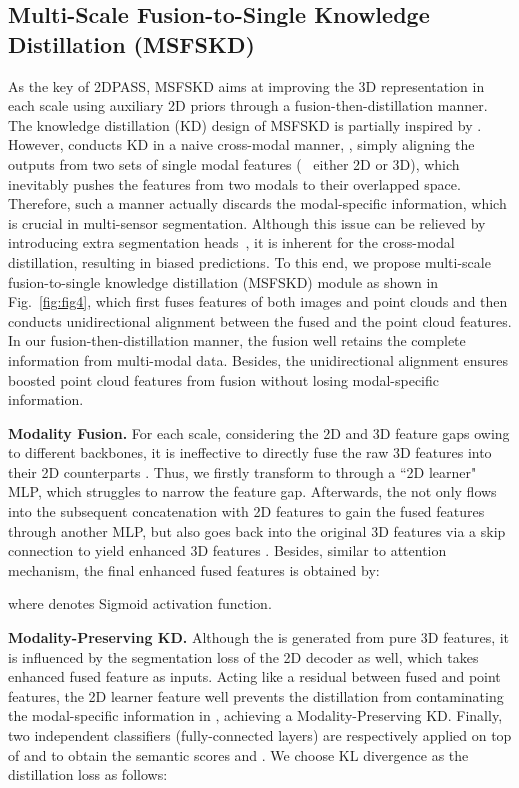 \documentclass[runningheads]{llncs}
\begin{document}
	\subsection{Multi-Scale Fusion-to-Single Knowledge Distillation (MSFSKD)}
	\label{sec:ms}
	As the key of 2DPASS, MSFSKD aims at improving the 3D representation in each scale using auxiliary 2D priors through a fusion-then-distillation manner.
The knowledge distillation (KD) design of MSFSKD is partially inspired by \cite{jaritz2020xmuda}.
However, \cite{jaritz2020xmuda} conducts KD in a naive cross-modal manner, \ie, simply aligning the outputs from two sets of single modal features (\ie~ either 2D or 3D), which inevitably pushes the features from two modals to their overlapped space.
Therefore, such a manner actually discards the modal-specific information, which is crucial in multi-sensor segmentation.
Although this issue can be relieved by introducing extra segmentation heads~\cite{jaritz2020xmuda}, it is inherent for the cross-modal distillation, resulting in biased predictions.
To this end, we propose multi-scale fusion-to-single knowledge distillation (MSFSKD) module as shown in Fig.~\ref{fig:fig4}, which first fuses features of both images and point clouds and then conducts unidirectional alignment between the fused and the point cloud features.
In our fusion-then-distillation manner, the fusion well retains the complete information from multi-modal data.
Besides, the unidirectional alignment ensures boosted point cloud features from fusion without losing modal-specific information.


    \noindent\textbf{Modality Fusion.}
	For each scale, considering the 2D and 3D feature gaps owing to different backbones, it is ineffective to directly fuse the raw 3D features  into their 2D counterparts .
Thus, we firstly transform  to  through a ``2D learner" MLP, which struggles to narrow the feature gap.
Afterwards, the  not only flows into the subsequent concatenation with 2D features  to gain the fused features  through another MLP, but also goes back into the original 3D features via a skip connection to yield enhanced 3D features .
Besides, similar to attention mechanism, the final enhanced fused features  is obtained by:
	
	where  denotes Sigmoid activation function.
	
	\noindent\textbf{Modality-Preserving KD.} Although the  is generated from pure 3D features, it is influenced by the segmentation loss of the 2D decoder as well, which takes enhanced fused feature  as inputs.
Acting like a residual between fused and point features, the 2D learner feature  well prevents the distillation from contaminating the modal-specific information in , achieving a Modality-Preserving KD.
Finally, two independent classifiers (fully-connected layers) are respectively applied on top of  and  to obtain the semantic scores  and .
We choose KL divergence as the distillation loss  as follows:
\end{document}
